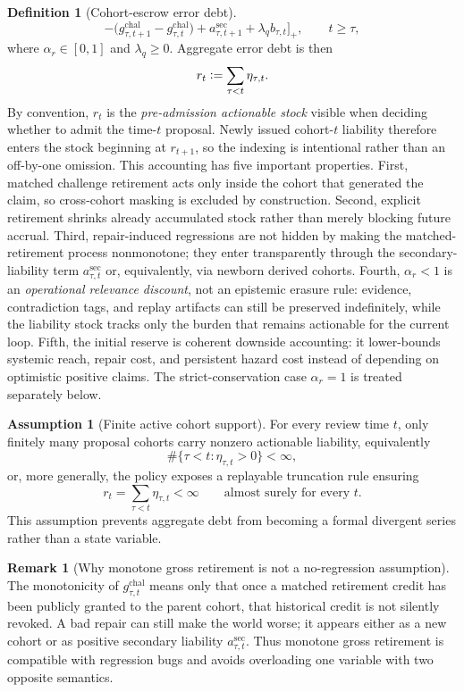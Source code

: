 \documentclass[11pt]{article}
\theoremstyle{definition}
\newtheorem{definition}[theorem]{Definition}
\newtheorem{assumption}[theorem]{Assumption}
\newtheorem{remark}[theorem]{Remark}
\newcommand{\1}{\mathbf{1}}
\newcommand{\Defeq}{\vcentcolon=}
\begin{document}
\begin{definition}[Cohort-escrow error debt]
\[-
\bigl(g_{\tau,t+1}^{\mathrm{chal}}-g_{\tau,t}^{\mathrm{chal}}\bigr)
+
a_{\tau,t+1}^{\mathrm{sec}}
+
\lambda_q b_{\tau,t}
\Bigr]_+,
\qquad t\ge \tau,
\]
where $\alpha_r\in[0,1]$ and $\lambda_q\ge0$. Aggregate error debt is then
\[
r_t\Defeq \sum_{\tau<t}\eta_{\tau,t}.
\]
By convention, $r_t$ is the \emph{pre-admission actionable stock} visible when deciding whether to admit the time-$t$ proposal. Newly issued cohort-$t$ liability therefore enters the stock beginning at $r_{t+1}$, so the indexing is intentional rather than an off-by-one omission.
This accounting has five important properties. First, matched challenge retirement acts only inside the cohort that generated the claim, so cross-cohort masking is excluded by construction. Second, explicit retirement shrinks already accumulated stock rather than merely blocking future accrual. Third, repair-induced regressions are not hidden by making the matched-retirement process nonmonotone; they enter transparently through the secondary-liability term $a_{\tau,t}^{\mathrm{sec}}$ or, equivalently, via newborn derived cohorts. Fourth, $\alpha_r<1$ is an \emph{operational relevance discount}, not an epistemic erasure rule: evidence, contradiction tags, and replay artifacts can still be preserved indefinitely, while the liability stock tracks only the burden that remains actionable for the current loop. Fifth, the initial reserve is coherent downside accounting: it lower-bounds systemic reach, repair cost, and persistent hazard cost instead of depending on optimistic positive claims. The strict-conservation case $\alpha_r=1$ is treated separately below.
\end{definition}

\begin{assumption}[Finite active cohort support]\label{ass:finite_active_cohorts}
For every review time $t$, only finitely many proposal cohorts carry nonzero actionable liability, equivalently
\[
\#\{\tau<t:\eta_{\tau,t}>0\}<\infty,
\]
or, more generally, the policy exposes a replayable truncation rule ensuring
\[
r_t=\sum_{\tau<t}\eta_{\tau,t}<\infty
\qquad\text{almost surely for every }t.
\]
This assumption prevents aggregate debt from becoming a formal divergent series rather than a state variable.
\end{assumption}

\begin{remark}[Why monotone gross retirement is not a no-regression assumption]
The monotonicity of $g_{\tau,t}^{\mathrm{chal}}$ means only that once a matched retirement credit has been publicly granted to the parent cohort, that historical credit is not silently revoked. A bad repair can still make the world worse; it appears either as a new cohort or as positive secondary liability $a_{\tau,t}^{\mathrm{sec}}$. Thus monotone gross retirement is compatible with regression bugs and avoids overloading one variable with two opposite semantics.
\end{remark}
\end{document}
